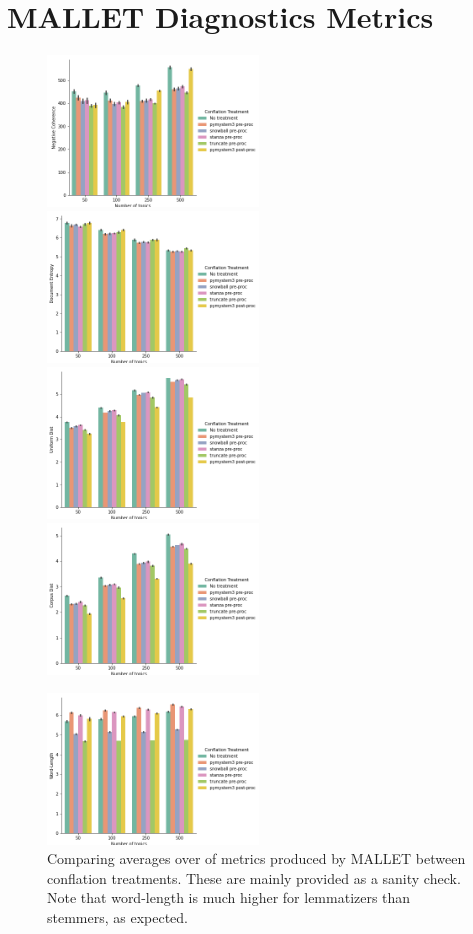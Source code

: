 \documentclass[11pt,a4paper]{article}
\begin{document}
\section{MALLET Diagnostics Metrics}
\begin{figure}[!th]
    \includegraphics[width=0.5\textwidth]{negative_coherence.png}
    \includegraphics[width=0.5\textwidth]{document_entropy.png}
    \includegraphics[width=0.5\textwidth]{uniform_dist.png}
    \includegraphics[width=0.5\textwidth]{corpus_dist.png}

    \includegraphics[width=0.5\textwidth]{word-length.png}
    \caption{Comparing averages over of metrics produced by MALLET between conflation treatments. These are mainly provided as a sanity check. Note that word-length is much higher for lemmatizers than stemmers, as expected.}
    \label{fig:mallet_metrics_figs}
\end{figure}
\end{document}
